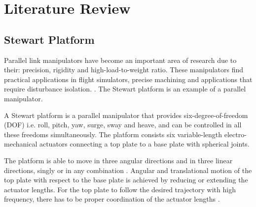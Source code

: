 \chapter{Literature Review}
\section{Stewart Platform}
Parallel link manipulators have become an important area of research due to their: precision, rigidity and high-load-to-weight ratio. These manipulators find practical applications in flight simulators, precise machining and applications that require disturbance isolation. \cite{iqbal_dynamic_2008}. The Stewart platform is an example of a parallel manipulator.

A Stewart platform is a parallel manipulator that provides six-degree-of-freedom (DOF) i.e. roll, pitch, yaw, surge, sway and heave, and can be controlled in all these freedoms simultaneously. The platform consists six variable-length electro-mechanical actuators connecting a top plate to a base plate with spherical joints.

The platform is able to move in three angular directions and in three linear directions, singly or in any combination \cite{stewart1965platform}. Angular and translational motion of the top plate with
respect to the base plate is achieved by reducing or extending the actuator lengths. For the top plate to follow the desired trajectory with high frequency, there has to be proper coordination of the actuator lengths \cite{iqbal_dynamic_2008}.

